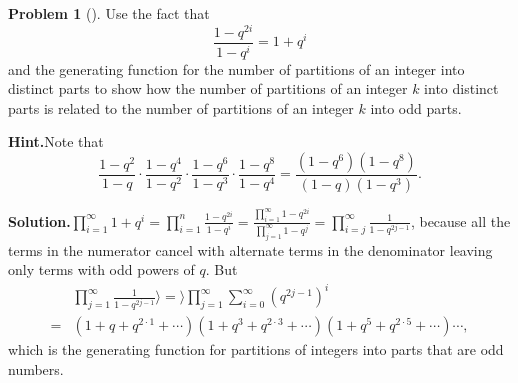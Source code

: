 \documentclass[10pt,]{book}
\theoremstyle{plain}
\theoremstyle{definition}
\newtheorem{activity}[project]{Problem}
\theoremstyle{definition}
\numberwithin{equation}{chapter}
\newcommand{\amp}{&}
\begin{document}
\begin{activity}[]\label{activity-208}
Use the fact that%
\begin{equation*}
\frac{1-q^{2i}}{1-q^i}= 1+q^i
\end{equation*}
and the generating function for the number of partitions of an integer into distinct parts to show how the number of partitions of an integer \(k\) into distinct parts is related to the number of partitions of an integer \(k\) into odd parts.%
\par\medskip\noindent%
\textbf{Hint.}\quad Note that%
\begin{equation*}
\frac{1-q^2}{1-q}\cdot \frac{1-q^4}{1-q^2}\cdot \frac{1-q^6}{1-q^3}\cdot \frac{1-q^8}{1-q^4} = \frac{(1-q^6)(1-q^8)}{(1-q)(1-q^3)} \text{.}
\end{equation*}
%
\par\medskip\noindent%
\textbf{Solution.}\quad \(\displaystyle\prod_{i=1}^\infty 1+q^i=\prod_{i=1}^n \frac{1-q^{2i}}{1-q^i}=\frac{\prod_{i=1}^\infty1-q^{2i}}{\prod_{j=1}^\infty 1-q^j} =\prod_{i=j}^\infty \frac{1}{1-q^{2j-1}}\), because all the terms in the numerator cancel with alternate terms in the denominator leaving only terms with odd powers of \(q\). But%
\begin{align*}
\amp \prod_{j=1}^\infty\frac{1}{1-q^{2j-1}}\rangle =\rangle \prod_{j=1}^\infty \sum_{i=0}^\infty (q^{2j-1})^i\\
=\amp (1+q+q^{2\cdot1}+\cdots)(1+q^3+q^{2\cdot3}+\cdots)(1
+q^5+q^{2\cdot5}+\cdots)\cdots,
\end{align*}
which is the generating function for partitions of integers into parts that are odd numbers.%
\end{activity}
\end{document}
